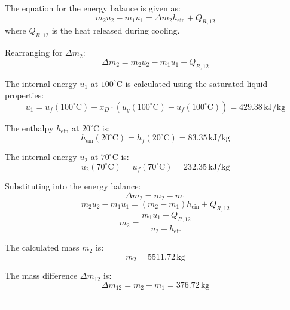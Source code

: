 The equation for the energy balance is given as:  
\[
m_2 u_2 - m_1 u_1 = \Delta m_2 h_{\text{ein}} + Q_{R,12}
\]  
where \( Q_{R,12} \) is the heat released during cooling.  

Rearranging for \( \Delta m_2 \):  
\[
\Delta m_2 = m_2 u_2 - m_1 u_1 - Q_{R,12}
\]  

The internal energy \( u_1 \) at \( 100^\circ\text{C} \) is calculated using the saturated liquid properties:  
\[
u_1 = u_f(100^\circ\text{C}) + x_D \cdot (u_g(100^\circ\text{C}) - u_f(100^\circ\text{C})) = 429.38 \, \text{kJ/kg}
\]  

The enthalpy \( h_{\text{ein}} \) at \( 20^\circ\text{C} \) is:  
\[
h_{\text{ein}}(20^\circ\text{C}) = h_f(20^\circ\text{C}) = 83.35 \, \text{kJ/kg}
\]  

The internal energy \( u_2 \) at \( 70^\circ\text{C} \) is:  
\[
u_2(70^\circ\text{C}) = u_f(70^\circ\text{C}) = 232.35 \, \text{kJ/kg}
\]  

Substituting into the energy balance:  
\[
\Delta m_2 = m_2 - m_1
\]  
\[
m_2 u_2 - m_1 u_1 = (m_2 - m_1) h_{\text{ein}} + Q_{R,12}
\]  
\[
m_2 = \frac{m_1 u_1 - Q_{R,12}}{u_2 - h_{\text{ein}}}
\]  

The calculated mass \( m_2 \) is:  
\[
m_2 = 5511.72 \, \text{kg}
\]  

The mass difference \( \Delta m_{12} \) is:  
\[
\Delta m_{12} = m_2 - m_1 = 376.72 \, \text{kg}
\]  

---